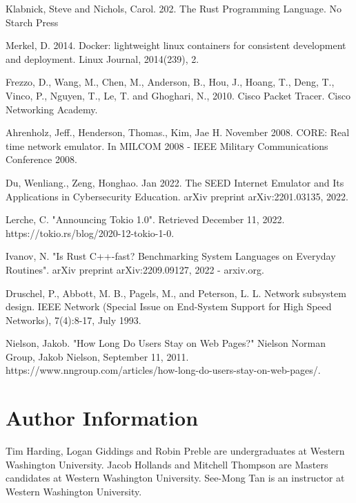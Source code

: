 \documentclass[journal]{IEEEtran} %
\begin{document}



\begin{thebibliography}{00}
     Klabnick, Steve and Nichols, Carol. 202. The Rust Programming Language. No Starch Press

     Merkel, D. 2014. Docker: lightweight linux containers for consistent development and deployment. Linux Journal, 2014(239), 2.

     Frezzo, D., Wang, M., Chen, M., Anderson, B., Hou, J., Hoang, T., Deng, T., Vinco, P., Nguyen, T., Le, T. and Ghoghari, N., 2010. Cisco Packet Tracer. Cisco Networking Academy.

     Ahrenholz, Jeff., Henderson, Thomas., Kim, Jae H. November 2008. CORE: Real time network emulator. In MILCOM 2008 - IEEE Military Communications Conference 2008.

     Du, Wenliang., Zeng, Honghao. Jan 2022. The SEED Internet Emulator and Its Applications in Cybersecurity Education. arXiv preprint arXiv:2201.03135, 2022.

     Lerche, C. "Announcing Tokio 1.0". Retrieved December 11, 2022. https://tokio.rs/blog/2020-12-tokio-1-0.

     Ivanov, N. "Is Rust C++-fast? Benchmarking System Languages on Everyday Routines". arXiv preprint arXiv:2209.09127, 2022 - arxiv.org.

     Druschel, P., Abbott, M. B., Pagels, M., and Peterson, L. L. Network subsystem design. IEEE Network (Special Issue on End-System Support for High Speed Networks), 7(4):8-17, July 1993.

     Nielson, Jakob. "How Long Do Users Stay on Web Pages?" Nielson Norman Group, Jakob Nielson, September 11, 2011. https://www.nngroup.com/articles/how-long-do-users-stay-on-web-pages/.

\end{thebibliography}



\section{Author Information}
Tim Harding, Logan Giddings and Robin Preble are undergraduates at Western Washington University. Jacob Hollands and Mitchell Thompson are Masters candidates at Western Washington University. See-Mong Tan is an instructor at Western Washington University.
\end{document}
